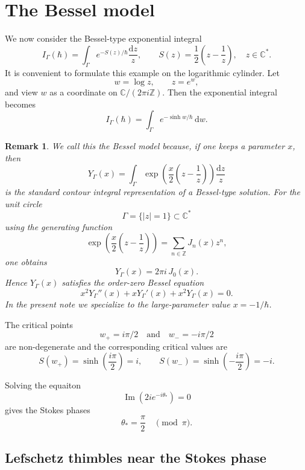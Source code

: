 \documentclass[11pt]{amsart}
\theoremstyle{plain}
\newtheorem{rmk}[thm]{Remark}
\newcommand{\C}{\mathbb C}
\newcommand{\Z}{\mathbb Z}
\newcommand{\dd}{\mathrm d}
\newcommand{\im}{\operatorname{Im}}
\begin{document}
\medskip 
\section{The Bessel model}
We now consider the Bessel-type exponential integral
\[I_{\Gamma}(\hbar)=\int_{\Gamma}e^{-S(z)/\hbar}\frac{\dd z}{z},\qquad S(z)=\frac{1}{2}\left(z-\frac{1}{z}\right),\quad z\in\C^*.\]
It is convenient to formulate this example on the logarithmic
cylinder.  Let
\[
w=\log z,
\qquad z=e^w,
\]
and view \(w\) as a coordinate on \(\C/(2\pi i\Z)\). 
Then the exponential integral becomes
\[
I_{\Gamma}(\hbar)
=
\int_{\Gamma}
e^{-\sinh w/\hbar}\,\dd w.
\]

\begin{rmk}
We call this the Bessel model because, if one keeps a parameter \(x\), then
\[
Y_\Gamma(x)
=
\int_\Gamma
\exp\left(\frac{x}{2}\left(z-\frac1z\right)\right)\frac{\dd z}{z}
\]
is the standard contour integral representation of a Bessel-type solution.
For the unit circle
\[\Gamma=\{|z|=1\}\subset\C^*\]
using the generating function
\[
\exp\left(\frac{x}{2}\left(z-\frac1z\right)\right)
=
\sum_{n\in\Z}J_n(x)z^n,
\]
one obtains
\[
Y_\Gamma(x)=2\pi i\,J_0(x).
\]
Hence \(Y_\Gamma(x)\) satisfies the order-zero Bessel equation
\[
x^2Y_\Gamma''(x)+xY_\Gamma'(x)+x^2Y_\Gamma(x)=0.
\]
In the present note we specialize to the large-parameter value
\(x=-1/\hbar\). 
\end{rmk}

The critical points 
$$
w_+=i\pi/2\quad  \text{and}\quad w_-=-i\pi/2
$$ 
are non-degenerate and 
the corresponding critical values are
\begin{equation*}
S(w_+)=\sinh\!\left(\frac{i\pi}{2}\right)=i,
\qquad
S(w_-)=\sinh\!\left(-\frac{i\pi}{2}\right)=-i.
\end{equation*}

Solving the equaiton
\[
\im(2ie^{-i\theta_*})=0
\]
gives the Stokes phases
\begin{equation*}
\theta_*=\frac{\pi}{2} \quad \pmod \pi.
\end{equation*}

\smallskip
\subsection{Lefschetz thimbles near the Stokes phase}
\end{document}
